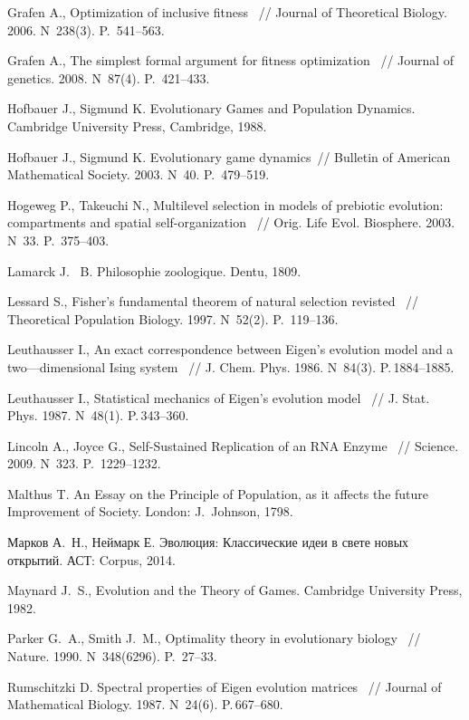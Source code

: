 \begin{thebibliography}{99}
 Grafen A.\:, Optimization of inclusive fitness ~// Journal of Theoretical Biology. 2006. N~238(3). P.\, 541--563. 

 Grafen A.\:, The simplest formal argument for fitness optimization ~// Journal of genetics. 2008. N~87(4). P.\, 421--433.

 Hofbauer J., Sigmund K.\: Evolutionary Games and Population Dynamics. Cambridge University Press, Cambridge, 1988.

 Hofbauer J., Sigmund K.\: Evolutionary game dynamics~// Bulletin of American Mathematical Society. 2003. N~40. P.\, 479--519.

 Hogeweg P., Takeuchi N.\:, Multilevel selection in models of prebiotic evolution: compartments and spatial self-organization ~// Orig. Life Evol. Biosphere. 2003. N~33. P.\, 375--403.

 Lamarck J. ~B.\: Philosophie zoologique. Dentu, 1809.

 Lessard S.\:, Fisher's fundamental theorem of natural selection revisted ~// Theoretical Population Biology. 1997. N~52(2). P.\, 119--136.

 Leuthausser I.\:,  An exact correspondence between Eigen's evolution model and a two---dimensional Ising system ~// J. Chem. Phys. 1986. N~84(3). P.\,1884--1885.

 Leuthausser I.\:,  Statistical mechanics of Eigen’s evolution model ~// J. Stat. Phys. 1987. N~48(1). P.\,343--360.

 Lincoln A., Joyce G.\:, Self-Sustained Replication of an RNA Enzyme ~// Science. 2009. N~323. P.\, 1229--1232.

 Malthus T.\: An Essay on the Principle of Population, as it affects the future Improvement of Society. London: J.~Johnson, 1798.

 Марков А.~Н., Неймарк Е.\: Эволюция: Классические идеи в свете новых открытий. АСТ: Corpus, 2014.

 Maynard J.~S.\:, Evolution and the Theory of Games. Cambridge University Press, 1982. 

 Parker G.~A., Smith J.~M.\:, Optimality theory in evolutionary biology ~// Nature. 1990. N~348(6296). P.\, 27--33.

 Rumschitzki D.\: Spectral properties of Eigen evolution matrices ~// Journal of Mathematical Biology. 1987. N~24(6). P.\,667--680.


\end{thebibliography}
